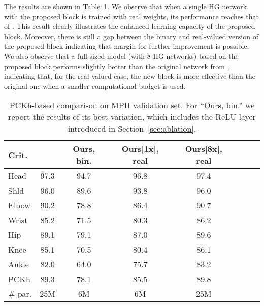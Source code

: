 \documentclass[10pt,journal,compsoc]{IEEEtran}
\begin{document}
The results are shown in Table~\ref{tab:mpii_results}. We observe that when a single HG network with the proposed block is trained with real weights, its performance reaches that of \cite{newell2016stacked}. This result clearly illustrates the enhanced learning capacity of the proposed block. Moreover, there is still a gap between the binary and real-valued version of the proposed block indicating that margin for further improvement is possible. We also observe that a full-sized model (with 8 HG networks) based on the proposed block performs slightly better than the original network from {\cite{newell2016stacked}}, indicating that, for the real-valued case, the new block is more effective than the original one when a smaller computational budget is used.

\begin{table}[!htbp]
    \renewcommand{\arraystretch}{1.3}
    \caption{PCKh-based comparison on MPII validation set. {\color{black}For ``Ours, bin.'' we report the results of its best variation, which includes the ReLU layer introduced in Section~\ref{sec:ablation}.}}
    \label{tab:mpii_results}
    \centering
    \begin{tabular}{|l|c|c|c|c|c|c|c|} \hline
        Crit.   & \cite{newell2016stacked} & Ours, bin. & Ours[1x], real & Ours[8x], real \\
        \hline\hline
        Head    & 97.3                     & 94.7       & 96.8           & 97.4           \\
        Shld    & 96.0                     & 89.6       & 93.8           & 96.0           \\
        Elbow   & 90.2                     & 78.8       & 86.4           & 90.7           \\
        Wrist   & 85.2                     & 71.5       & 80.3           & 86.2           \\
        Hip     & 89.1                     & 79.1       & 87.0           & 89.6           \\
        Knee    & 85.1                     & 70.5       & 80.4           & 86.1           \\
        Ankle   & 82.0                     & 64.0       & 75.7           & 83.2           \\
        \hline
        PCKh    & 89.3                     & 78.1       & 85.5           & 89.8           \\
        \hline
        \# par. & 25M                      & 6M         & 6M             & 25M            \\
        \hline
    \end{tabular}
\end{table}
\end{document}
